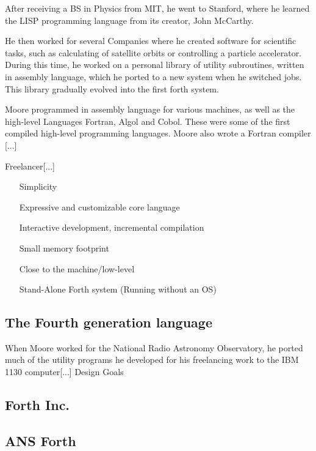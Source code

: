 \documentclass{llncs}
\begin{document}
After receiving a BS in Physics from MIT, he went to Stanford, where he learned the LISP programming language from its creator, John McCarthy. \cite{chuckbio}

He then worked for several Companies where he created software for scientific tasks, such as calculating of satellite orbits or controlling a particle accelerator.
During this time, he worked on a personal library of utility subroutines, written in assembly language, which he ported to a new system when he switched jobs.
This library gradually evolved into the first forth system.

Moore programmed in assembly language for various machines, as well as the high-level Languages Fortran, Algol and Cobol. These were some of the first compiled high-level programming languages. Moore also wrote a Fortran compiler [...]

Freelancer[...]

\begin{itemize}
\item[Simplicity]
\item[Expressive and customizable core language]
\item[Interactive development, incremental compilation]%
\item[Small memory footprint] %
\item[Close to the machine/low-level]
\item[Stand-Alone Forth system](Running without an OS)
\end{itemize}

\subsection{The Fourth generation language}
When Moore worked for the National Radio Astronomy Observatory, he ported much of the utility programs he developed for his freelancing work to the IBM 1130 computer[...]
Design Goals



\subsection{Forth Inc.}

\subsection{ANS Forth}
\end{document}
